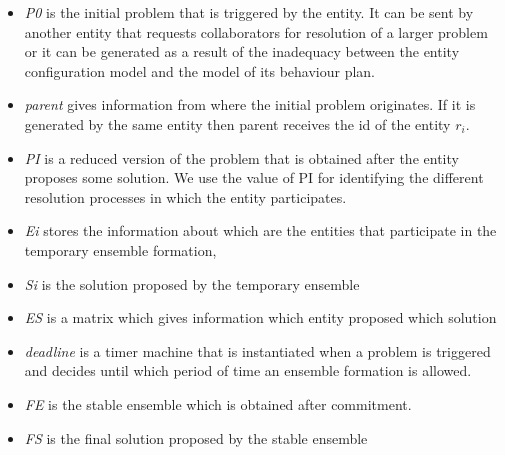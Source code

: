 \documentclass[journal]{IEEEtran}
\theoremstyle{definition}
\begin{document}
\begin{itemize}
\item \textit{P0} is the initial problem that is triggered by the entity. It can be sent by another entity that requests collaborators for resolution of a larger problem or 
it can be generated as a result of the inadequacy between the entity configuration model and the model of its behaviour plan.
\item \textit{parent} gives information from where the initial problem originates. If it is generated by the same entity then parent receives the id of the entity $r_i$.
\item \textit{PI} is a reduced version of the problem that is obtained after the entity proposes some solution. We use the value of PI for identifying the different resolution processes in which the entity participates.
\item \textit{Ei} stores the information about which are the entities that participate in the temporary ensemble formation, 
\item \textit{Si} is the solution proposed by the temporary ensemble 
\item \textit{ES} is a matrix which gives information which entity proposed which solution
\item \textit{deadline} is a timer machine that is instantiated when a problem is triggered and decides until which period of time an ensemble formation is allowed.
\item \textit{FE} is the stable ensemble which is obtained after commitment.
\item \textit{FS} is the final solution proposed by the stable ensemble
\end{itemize}






\end{document}
